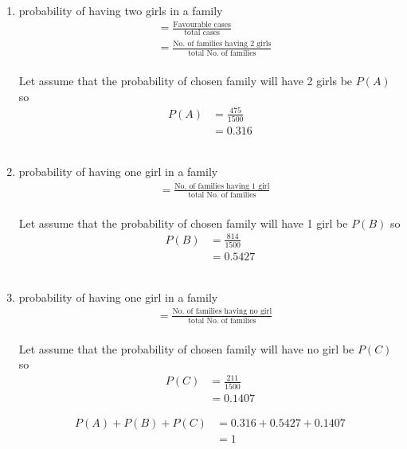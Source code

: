 \renewcommand{\theequation}{\theenumi}
\begin{enumerate}[label=\arabic*.,ref=\thesubsection.\theenumi]
\item probability of having two girls in a family
\begin{align}
&= \frac{\text {Favourable cases} }{\text {total cases}}
\\
&=\frac{\text {No. of families having 2 girls} }{\text {total No. of families}}
\end{align} 
\\
Let assume that the probability of chosen family will have 2 girls  be $P\left(A\right)$ so 
\begin{align}
P\left(A\right)&= \frac{475}{1500}
\\
&= 0.316
\end{align}
\\
\item probability of having one  girl in a family
\begin{align}
&=\frac{\text {No. of families having 1 girl} }{\text {total No. of families}}
\end{align} 
\\
Let assume that the probability of chosen family will have 1 girl  be $P\left(B\right)$ so 
\begin{align}
P\left(B\right)&= \frac{814}{1500}
\\
&= 0.5427
\end{align} 
\\
\item probability of having one  girl in a family
\begin{align}
&=\frac{\text {No. of families having no girl} }{\text {total No. of families}}
\end{align} 
\\
Let assume that the probability of chosen family will have no girl  be $P\left(C\right)$ so 
\begin{align}
P\left(C\right)&= \frac{211}{1500}
\\
&= 0.1407
\end{align} 

\begin{align}
P(A) + P(B) + P(C) &= 0.316 + 0.5427 + 0.1407
\\
&= 1
\end{align}
\end{enumerate}